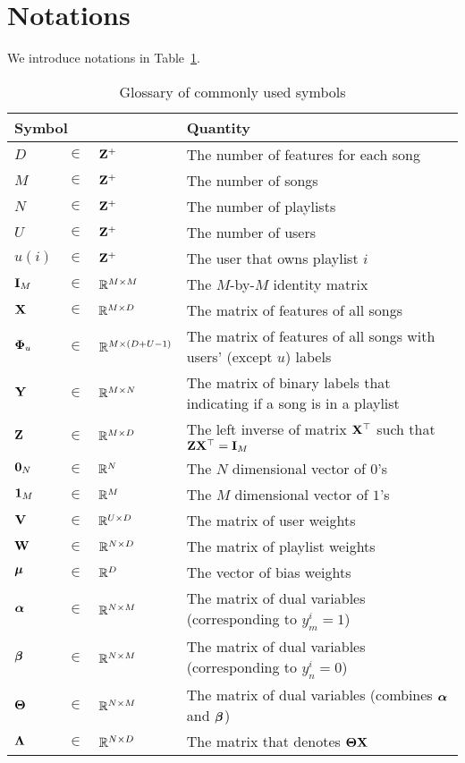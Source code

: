 \section{Notations}

We introduce notations in Table~\ref{tab:symbol_tpush}.
\begin{table}[!h]
\caption{Glossary of commonly used symbols}
\label{tab:symbol_tpush}
\renewcommand{\arraystretch}{1.5} %
\setlength{\tabcolsep}{1pt} %
\centering
\begin{tabular}{llll}
\toprule
\multicolumn{3}{l}{\textbf{Symbol}} & \textbf{Quantity} \\ \midrule
$D$        &  $\in$  &  $\mathbf{Z}^+$            & The number of features for each song \\
$M$        &  $\in$  &  $\mathbf{Z}^+$            & The number of songs \\
$N$        &  $\in$  &  $\mathbf{Z}^+$            & The number of playlists \\
$U$        &  $\in$  &  $\mathbf{Z}^+$            & The number of users \\
$u(i)$     &  $\in$  &  $\mathbf{Z}^+$            & The user that owns playlist $i$ \\
$\mathbf{I}_M$     &  $\in$  &  $\mathbb{R}^{M \times M}$ & The $M$-by-$M$ identity matrix \\
$\mathbf{X}$       &  $\in$  &  $\mathbb{R}^{M \times D}$ & The matrix of features of all songs \\
$\mathbf{\Phi}_u$ &  $\in$  &  $\mathbb{R}^{M \times (D + U -1)}$ & The matrix of features of all songs with users' (except $u$) labels \\
$\mathbf{Y}$       &  $\in$  &  $\mathbb{R}^{M \times N}$ & The matrix of binary labels that indicating if a song is in a playlist \\
$\mathbf{Z}$       &  $\in$  &  $\mathbb{R}^{M \times D}$ & The left inverse of matrix $\mathbf{X}^\top$ such that $\mathbf{Z} \mathbf{X}^\top = \mathbf{I}_M$ \\
$\mathbf{0}_N$  &  $\in$  &  $\mathbb{R}^N$            & The $N$ dimensional vector of $0$'s \\
$\mathbf{1}_M$   &  $\in$  &  $\mathbb{R}^M$            & The $M$ dimensional vector of $1$'s \\
$\mathbf{V}$       &  $\in$  &  $\mathbb{R}^{U \times D}$ & The matrix of user weights \\
$\mathbf{W}$       &  $\in$  &  $\mathbb{R}^{N \times D}$ & The matrix of playlist weights \\
$\bm{\mu}$    &  $\in$  &  $\mathbb{R}^D$            & The vector of bias weights \\
${\bm{\alpha}}$ &  $\in$  &  $\mathbb{R}^{N \times M}$ & The matrix of dual variables (corresponding to $y_m^i=1$) \\
${\bm{\beta}}$  &  $\in$  &  $\mathbb{R}^{N \times M}$ & The matrix of dual variables (corresponding to $y_n^i=0$) \\
$\mathbf{\Theta}$ &  $\in$  &  $\mathbb{R}^{N \times M}$ & The matrix of dual variables (combines ${\bm{\alpha}}$ and ${\bm{\beta}}$) \\
$\mathbf{\Lambda}$&  $\in$  &  $\mathbb{R}^{N \times D}$ & The matrix that denotes $\mathbf{\Theta} \mathbf{X}$ \\
\bottomrule
\end{tabular}
\end{table}
